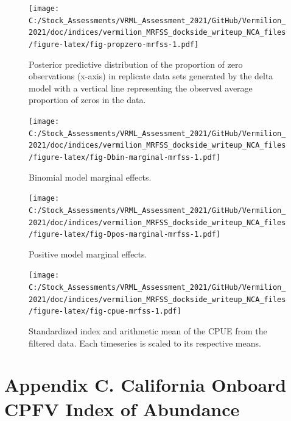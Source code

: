 \documentclass[11pt,
  english,
]{article}
\begin{document}
\begin{figure}
\centering
\texttt{[image: C:/Stock\_Assessments/VRML\_Assessment\_2021/GitHub/Vermilion\_2021/doc/indices/vermilion\_MRFSS\_dockside\_writeup\_NCA\_files/figure-latex/fig-propzero-mrfss-1.pdf]}
\caption{\label{fig:fig-propzero-mrfss}Posterior predictive distribution of the proportion of zero observations (x-axis) in replicate data sets generated by the delta model with a vertical line representing the observed average proportion of zeros in the data.}
\end{figure}

\FloatBarrier

\begin{figure}
\centering
\texttt{[image: C:/Stock\_Assessments/VRML\_Assessment\_2021/GitHub/Vermilion\_2021/doc/indices/vermilion\_MRFSS\_dockside\_writeup\_NCA\_files/figure-latex/fig-Dbin-marginal-mrfss-1.pdf]}
\caption{\label{fig:fig-Dbin-marginal-mrfss}Binomial model marginal effects.}
\end{figure}

\begin{figure}
\centering
\texttt{[image: C:/Stock\_Assessments/VRML\_Assessment\_2021/GitHub/Vermilion\_2021/doc/indices/vermilion\_MRFSS\_dockside\_writeup\_NCA\_files/figure-latex/fig-Dpos-marginal-mrfss-1.pdf]}
\caption{\label{fig:fig-Dpos-marginal-mrfss}Positive model marginal effects.}
\end{figure}

\begin{figure}
\centering
\texttt{[image: C:/Stock\_Assessments/VRML\_Assessment\_2021/GitHub/Vermilion\_2021/doc/indices/vermilion\_MRFSS\_dockside\_writeup\_NCA\_files/figure-latex/fig-cpue-mrfss-1.pdf]}
\caption{\label{fig:fig-cpue-mrfss}Standardized index and arithmetic mean of the CPUE from the filtered data. Each timeseries is scaled to its respective means.}
\end{figure}

\newpage


\hypertarget{appendix-c.-california-onboard-cpfv-index-of-abundance}{%
\section*{Appendix C. California Onboard CPFV Index of Abundance}\label{appendix-c.-california-onboard-cpfv-index-of-abundance}}
\end{document}
